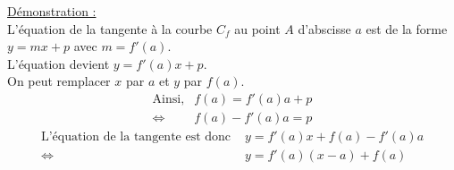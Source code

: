 \documentclass[11pt,a4paper]{article}
\begin{document}
\underline{Démonstration :} \\

L'équation de la tangente à la courbe $C_f$ au point $A$ d'abscisse $a$ est de la forme $y=mx+p$ avec $m=f'(a)$. \\
L'équation devient $y=f'(a)x+p$. \\
On peut remplacer $x$ par $a$ et $y$ par $f(a)$.
\vspace{-8pt}
\begin{align*}
    \text{Ainsi,}            & f(a)=f'(a)a+p \\
    \Leftrightarrow \text{ } & f(a)-f'(a)a=p
\end{align*}
\vspace{-30pt}
\begin{align*}
    \text{L'équation de la tangente est donc } & y= f'(a)x+f(a)-f'(a)a \\
    \Leftrightarrow \text{ }                   & y =f'(a)(x-a)+f(a)
\end{align*}
\end{document}
